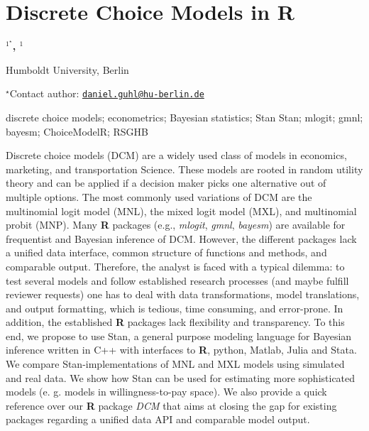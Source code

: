 \documentclass[\main/boa.tex]{subfiles}
\begin{document}
\section{Discrete Choice Models in R}

\begin{center}
  {\bf {}$^{1^\star}$, $^{1}$}
\end{center}

\vskip 0.3cm

\begin{affiliations}
\begin{enumerate}
\begin{minipage}{0.915\textwidth}
\centering
\item Humboldt University, Berlin \\[-2pt]
\end{minipage}
\end{enumerate}
$^\star$Contact author: \href{mailto:daniel.guhl@hu-berlin.de}{\nolinkurl{daniel.guhl@hu-berlin.de}}\\
\end{affiliations}

\vskip 0.5cm

\begin{minipage}{0.915\textwidth}
\keywords discrete choice models; econometrics; Bayesian statistics; Stan
\packages Stan; mlogit; gmnl; bayesm; ChoiceModelR; RSGHB
\end{minipage}

\vskip 0.8cm

Discrete choice models (DCM) are a widely used class of models in
economics, marketing, and transportation Science. These models are
rooted in random utility theory and can be applied if a decision maker
picks one alternative out of multiple options. The most commonly used
variations of DCM are the multinomial logit model (MNL), the mixed logit
model (MXL), and multinomial probit (MNP). Many \textbf{R} packages
(e.g., \emph{mlogit}, \emph{gmnl}, \emph{bayesm}) are available for
frequentist and Bayesian inference of DCM. However, the different
packages lack a unified data interface, common structure of functions
and methods, and comparable output. Therefore, the analyst is faced with
a typical dilemma: to test several models and follow established
research processes (and maybe fulfill reviewer requests) one has to deal
with data transformations, model translations, and output formatting,
which is tedious, time consuming, and error-prone. In addition, the
established \textbf{R} packages lack flexibility and transparency. To
this end, we propose to use Stan, a general purpose modeling language
for Bayesian inference written in C++ with interfaces to \textbf{R},
python, Matlab, Julia and Stata. We compare Stan-implementations of MNL
and MXL models using simulated and real data. We show how Stan can be
used for estimating more sophisticated models (e. g. models in
willingness-to-pay space). We also provide a quick reference over our
\textbf{R} package \emph{DCM} that aims at closing the gap for existing
packages regarding a unified data API and comparable model output.
\end{document}

